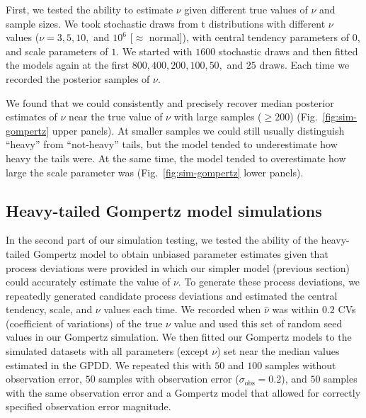 First, we tested the ability to estimate $\nu$ given different true values of
$\nu$ and sample sizes. We took stochastic draws from t distributions with
different $\nu$ values ($\nu = 3, 5, 10,$ and $10^6$ [$\approx$ normal]), with
central tendency parameters of $0$, and scale parameters of $1$. We started with
$1600$ stochastic draws and then fitted the models again at the first $800, 400,
200, 100, 50,$ and $25$ draws. Each time we recorded the posterior samples of
$\nu$.

We found that we could consistently and precisely recover median posterior
estimates of $\nu$ near the true value of $\nu$ with large samples ($\ge 200$)
(Fig.~\ref{fig:sim-gompertz} upper panels). At smaller samples we could still
usually distinguish ``heavy'' from ``not-heavy'' tails, but the model tended to
underestimate how heavy the tails were. At the same time, the model tended to
overestimate how large the scale parameter was (Fig.~\ref{fig:sim-gompertz}
lower panels).

\subsection{Heavy-tailed Gompertz model simulations}

In the second part of our simulation testing, we tested the ability of the
heavy-tailed Gompertz model to obtain unbiased parameter estimates given that
process deviations were provided in which our simpler model (previous
section) could accurately estimate the value of $\nu$. To generate these process
deviations, we repeatedly generated candidate process deviations and estimated the
central tendency, scale, and $\nu$ values each time. We recorded when
$\hat{\nu}$ was within $0.2$ CVs (coefficient of variations) of the true $\nu$
value and used this set of random seed values in our Gompertz simulation. We
then fitted our Gompertz models to the simulated datasets with all parameters
(except $\nu$) set near the median values estimated in the GPDD. We repeated
this with $50$ and $100$ samples without observation error, $50$ samples with
observation error ($\sigma_\mathrm{obs} = 0.2$), and $50$ samples with the same
observation error and a Gompertz model that allowed for correctly specified
observation error magnitude.

